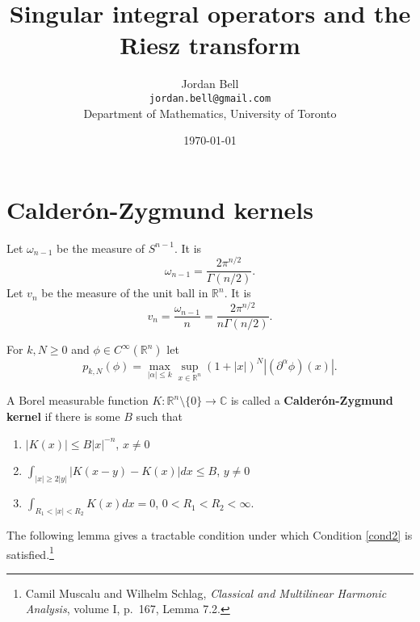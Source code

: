 \documentclass{article}
\theoremstyle{definition}
\begin{document}
\title{Singular integral operators and the Riesz transform}
\author{Jordan Bell\\ \texttt{jordan.bell@gmail.com}\\Department of Mathematics, University of Toronto}
\date{\today}

\maketitle

\section{Calder\'on-Zygmund kernels}
Let $\omega_{n-1}$ be the measure of $S^{n-1}$. It is 
\[
\omega_{n-1} = \frac{2\pi^{n/2}}{\Gamma(n/2)}.
\]
Let $v_n$ be the measure
of the unit ball in $\mathbb{R}^n$. It is
\[
v_n = \frac{\omega_{n-1}}{n} = \frac{2\pi^{n/2}}{n\Gamma(n/2)}.
\]

For $k,N \geq 0$ and $\phi \in C^\infty(\mathbb{R}^n)$ let
\[
p_{k,N}(\phi) = \max_{|\alpha| \leq k} \sup_{x \in \mathbb{R}^n} 
(1+|x|)^{N} |(\partial^\alpha \phi)(x)|.
\]
 

A Borel measurable function $K:\mathbb{R}^n \setminus \{0\} \to \mathbb{C}$ is called a 
\textbf{Calder\'on-Zygmund kernel} if there is some $B$ such that
\begin{enumerate}
\item $|K(x)| \leq B|x|^{-n}$, $x \neq 0$ \label{cond1}
\item $\int_{|x| \geq 2|y|} |K(x-y)-K(x)| dx \leq B$, $y \neq 0$ \label{cond2}
\item $\int_{R_1<|x|<R_2} K(x) dx = 0$, $0<R_1<R_2<\infty$. \label{cond3}
\end{enumerate}

The following lemma gives a tractable condition under which 
Condition \ref{cond2} is satisfied.\footnote{Camil Muscalu and Wilhelm Schlag, {\em Classical
and Multilinear Harmonic Analysis}, volume I, p.~167, Lemma 7.2.}
\end{document}
